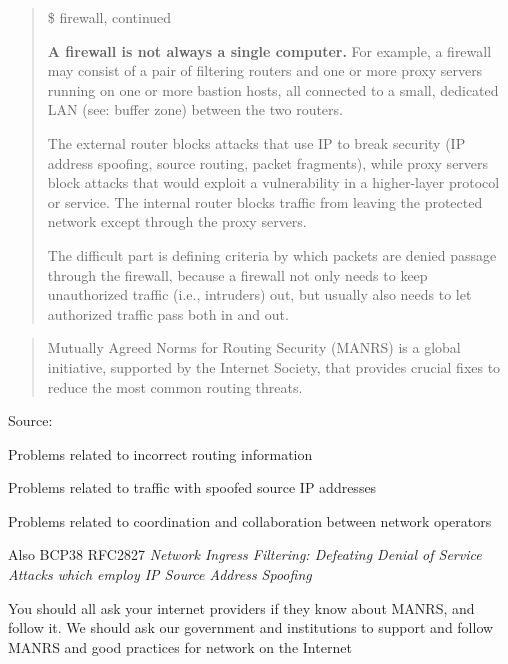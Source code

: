 \documentclass[Screen16to9,17pt]{foils}
\begin{document}
\begin{quote}
\$ firewall, continued

      {\bf A firewall is not always a single computer.} For example, a
      firewall may consist of a pair of filtering routers and one or
      more proxy servers running on one or more bastion hosts, all
      connected to a small, dedicated LAN (see: buffer zone) between the
      two routers.

      The external router blocks attacks that use IP to
      break security (IP address spoofing, source routing, packet
      fragments), while proxy servers block attacks that would exploit a
      vulnerability in a higher-layer protocol or service. The internal
      router blocks traffic from leaving the protected network except
      through the proxy servers.

      The difficult part is defining criteria by which packets are denied passage through the firewall, because
      a firewall not only needs to keep unauthorized traffic (i.e., intruders) out, but usually also needs to let authorized traffic
      pass both in and out.
\end{quote}



\begin{quote}
  Mutually Agreed Norms for Routing Security (MANRS) is a global initiative, supported by the Internet Society, that provides crucial fixes to reduce the most common routing threats. ﻿
\end{quote}
Source: {\small{}}

\begin{list2}
\item Problems related to incorrect routing information
\item Problems related to traffic with spoofed source IP addresses
\item Problems related to coordination and collaboration between network operators
\item Also BCP38 RFC2827 \emph{Network Ingress Filtering: Defeating Denial of Service Attacks
which employ IP Source Address Spoofing}
\end{list2}

You should all ask your internet providers if they know about MANRS, and follow it. We should ask our government and institutions to support and follow MANRS and good practices for network on the Internet
\end{document}
